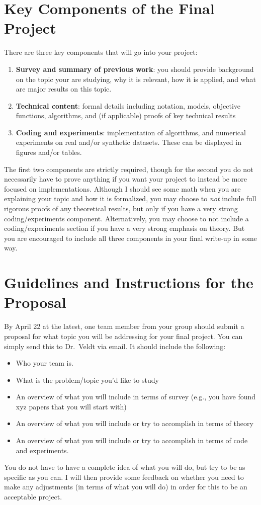 \documentclass{article}
\begin{document}
	\section{Key Components of the Final Project}
	There are three key components that will go into your project:
	\begin{enumerate}
		\item \textbf{Survey and summary of previous work}: you should provide background on the topic your are studying, why it is relevant, how it is applied, and what are major results on this topic.
		\item \textbf{Technical content}: formal details including notation, models, objective functions, algorithms, and (if applicable) proofs of key technical results 
		\item \textbf{Coding and experiments}: implementation of algorithms, and numerical experiments on real and/or synthetic datasets. These can be displayed in figures and/or tables. 
	\end{enumerate}
	The first two components are strictly required, though for the second you do not necessarily have to prove anything if you want your project to instead be more focused on implementations.
	 Although I should see some math when you are explaining your topic and how it is formalized, you may choose to \emph{not} include full rigorous proofs of any theoretical results, but only if you have a very strong coding/experiments component. Alternatively, you may choose to not include a coding/experiments section if you have a very strong emphasis on theory. But you are encouraged to include all three components in your final write-up in some way.
	
	\section{Guidelines and Instructions for the Proposal}
	By April 22 at the latest, one team member from your group should submit a proposal for what topic you will be addressing for your final project. You can simply send this to Dr.\ Veldt via email. It should include the following:
	
	\begin{itemize}
	\item Who your team is.
		\item What is the problem/topic you’d like to study
		\item An overview of what you will include in terms of survey (e.g., you have found xyz papers that you will start with)
		\item An overview of what you will include or try to accomplish in terms of theory
		\item An overview of what you will include or try to accomplish in terms of code and experiments.
	\end{itemize}
	You do not have to have a complete idea of what you will do, but try to be as specific as you can. I will then provide some feedback on whether you need to make any adjustments (in terms of what you will do) in order for this to be an acceptable project.
	
\end{document}
